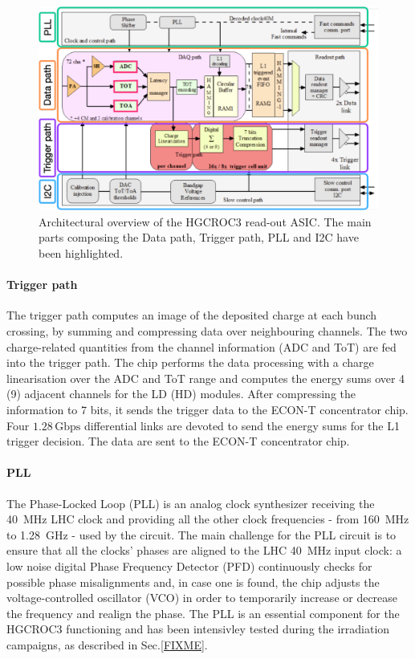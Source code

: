 \begin{figure}
    \centering
    \includegraphics[width=0.75\linewidth]{Figures/HGCAL/Architecture.pdf}
    \caption{Architectural overview of the HGCROC3 read-out ASIC. The main parts composing the Data path, Trigger path, PLL and I2C have been highlighted.}
    \label{fig:Architecture}
\end{figure}

\paragraph{Trigger path}
The trigger path computes an image of the deposited charge at each bunch crossing, by summing and compressing data over neighbouring channels. The two charge-related quantities from the channel information (ADC and ToT) are fed into the trigger path. The chip performs the data processing with a charge linearisation over the ADC and ToT range and computes the energy sums over 4 (9) adjacent channels for the LD (HD) modules. After compressing the information to 7 bits, it sends the trigger data to the ECON-T concentrator chip.
Four $1.28\,\textrm{Gbps}$ differential links are devoted to send the energy sums for the L1 trigger decision. The data are sent to the ECON-T concentrator chip.

\paragraph{PLL}
The Phase-Locked Loop (PLL) is an analog clock synthesizer receiving the 40~MHz LHC clock and providing all the other clock frequencies - from 160~MHz to 1.28~GHz - used by the circuit.
The main challenge for the PLL circuit is to ensure that all the clocks' phases are aligned to the LHC 40~MHz input clock: a low noise digital Phase Frequency Detector (PFD) continuously checks for possible phase misalignments and, in case one is found, the chip adjusts the voltage-controlled oscillator (VCO) in order to temporarily increase or decrease the frequency and realign the phase. The PLL is an essential component for the HGCROC3 functioning and has been intensivley tested during the irradiation campaigns, as described in Sec.\ref{FIXME}.

